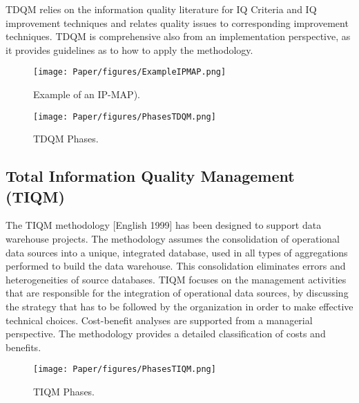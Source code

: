\documentclass[pdftex,english,oribibl]{llncs}
\begin{document}
TDQM relies on the information quality literature for IQ Criteria and IQ improvement techniques and relates quality issues to corresponding improvement techniques.
TDQM is comprehensive also from an implementation perspective, as it provides guidelines as to how to apply the methodology.

\begin{comment}
In applying TDQM, an organization must:
(a) clearly understand the IPs;
(b) establish an IP team consisting of a senior executive as the TDQM champion, an IP engineer who is familiar with the TDQM methodology, and members who are information suppliers, manufacturers, consumers, and IP managers;
(c) teach IQ assessment and IQ management to all the IP constituencies; and
(d) institutionalize continuous IP improvement.
\end{comment}

\begin{figure}
    \centering
    \texttt{[image: Paper/figures/ExampleIPMAP.png]}
    \caption{Example of an IP-MAP).}
    \label{fig:ExampleIPMAP}
 \end{figure}


\begin{figure}
    \centering
    \texttt{[image: Paper/figures/PhasesTDQM.png]}
    \caption{TDQM Phases.}
    \label{fig:PhasesTDQM}
 \end{figure}

\subsection{Total Information Quality Management (TIQM)}

The TIQM methodology [English 1999] has been designed to support data warehouse projects. The methodology assumes the consolidation of operational data sources into a unique, integrated database, used in all types of aggregations performed to build the data warehouse. This consolidation eliminates errors and heterogeneities of source databases. TIQM focuses on the management activities that are responsible for the integration of operational data sources, by discussing the strategy that has to be followed by the organization in order to make effective technical choices. Cost-benefit analyses are supported from a managerial perspective. The methodology provides a detailed classification of costs and benefits.

\begin{figure}
    \centering
    \texttt{[image: Paper/figures/PhasesTIQM.png]}
    \caption{TIQM Phases.}
    \label{fig:PhasesTIQM}
 \end{figure}
\end{document}
